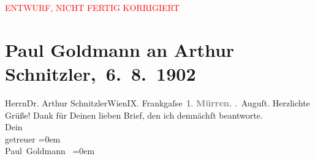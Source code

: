 
\begin{center}
            \textcolor{red}{ENTWURF, NICHT FERTIG KORRIGIERT}
                      \end{center}
            
         \renewcommand{\erwaehnteOrte}{Orte: Frankgasse, Mürren, Wien}
         \renewcommand{\erwaehnteWerke}{}
               \section[ Paul Goldmann an Arthur Schnitzler, 6. 8. 1902]{ Paul Goldmann an Arthur Schnitzler, 6. 8. 1902}\nopagebreak{}\rehead{ }\begin{ledgroupsized}[t]{13cm}\normalsize\beginnumbering \toendnotes[C]{\smallbreak\pagebreak[2]} 
\pstart{}{\pb}Herrn\pend{}\pstart{}Dr. Arthur Schnitzler\pend{}\pstart{}Wien\pend{}\pstart{}IX. Frankgaſse 1.\pend{}{\bigskip}\pstart
           \noindent{}{\pb}\textcolor{gray}{\textbf{Mürren.}}\pend
           . Auguſt.\pend
           \pstart
           Herzlichte Grüße! Dank für Deinen lieben Brief, den ich demnächſt beantworte.
                    {\\}Dein\pend
           \pstart
           {\\[\baselineskip]}getreuer\pend
           \leftskip=0em{}\pstart
           {\\[\baselineskip]}\spacefill\mbox{Paul Goldmann }\pend
           \leftskip=0em{}
         
         \endnumbering{}\end{ledgroupsized}\begin{anhang}\end{anhang}\newcommand{\dateiname}{L03217}\newcommand{\titel}{Paul Goldmann an Arthur Schnitzler, 6. 8. 1902}\newcommand{\editorInnen}{Martin Anton Müller und Laura Untner}
      